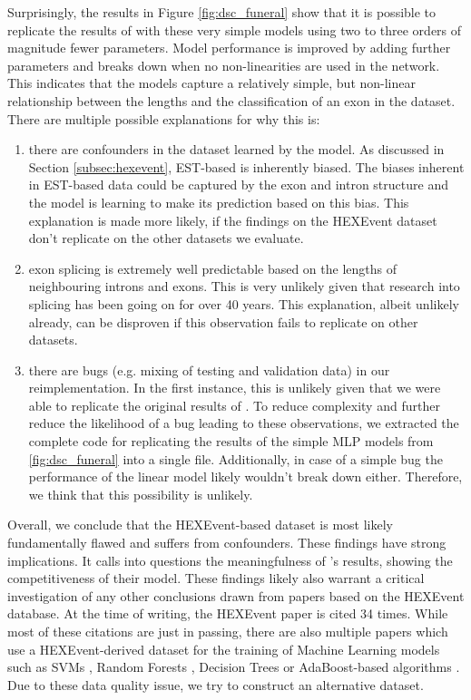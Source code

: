 Surprisingly, the results in Figure \ref{fig:dsc_funeral} show that it is possible to replicate the results of \cite{dsc} with these very simple models using two to three orders of magnitude fewer parameters. Model performance is improved by adding further parameters and breaks down when no non-linearities are used in the network. This indicates that the models capture a relatively simple, but non-linear relationship between the lengths and the classification of an exon in the dataset. 
There are multiple possible explanations for why this is:
\begin{enumerate}
	\item there are confounders in the dataset learned by the model. As discussed in Section \ref{subsec:hexevent}, EST-based is inherently biased. The biases inherent in EST-based data could be captured by the exon and intron structure and the model is learning to make its prediction based on this bias. This explanation is made more likely, if the findings on the HEXEvent dataset don't replicate on the other datasets we evaluate.
	\item exon splicing is extremely well predictable based on the lengths of neighbouring introns and exons. This is very unlikely given that research into splicing has been going on for over 40 years. This explanation, albeit unlikely already, can be disproven if this observation fails to replicate on other datasets.
	\item there are bugs (e.g. mixing of testing and validation data) in our reimplementation. In the first instance, this is unlikely given that we were able to replicate the original results of \cite{dsc}. To reduce complexity and further reduce the likelihood of a bug leading to these observations, we extracted the complete code for replicating the results of the simple MLP models from \ref{fig:dsc_funeral} into a single file. Additionally, in case of a simple bug the performance of the linear model likely wouldn't break down either. Therefore, we think that this possibility is unlikely. 
\end{enumerate}

Overall, we conclude that the HEXEvent-based dataset is most likely fundamentally flawed and suffers from confounders.
These findings have strong implications. It calls into questions the meaningfulness of \cite{dsc}'s results, showing the competitiveness of their model. These findings likely also warrant a critical investigation of any other conclusions drawn from papers based on the HEXEvent database. At the time of writing, the HEXEvent paper is cited 34 times. While most of these citations are just in passing, there are also multiple papers which use a HEXEvent-derived dataset for the training of Machine Learning models such as SVMs \cite{buschhertel}, Random Forests \cite{flawed1}, Decision Trees \cite{flawed2} or AdaBoost-based algorithms \cite{flawed3}. Due to these data quality issue, we try to construct an alternative dataset.


